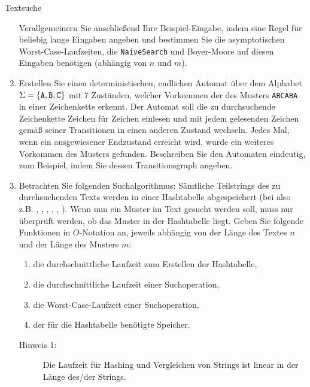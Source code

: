 \documentclass[11pt,a4paper]{article}
\begin{document}
\begin{aufgabe}{3}{Textsuche}
\begin{enumerate}[label=\alph*)]
        Verallgemeinern Sie anschließend Ihre Beispiel-Eingabe, indem eine Regel für beliebig lange  Eingaben angeben und bestimmen Sie die asymptotischen Worst-Case-Laufzeiten, die \texttt{NaiveSearch} und Boyer-Moore auf diesen Eingaben benötigen (abhängig von $n$ und $m$).

        \item Erstellen Sie einen deterministischen, endlichen Automat über dem Alphabet $\Sigma = \{\text{\texttt{A}}, \text{\texttt{B}}, \text{\texttt{C}}\}$ mit 7 Zuständen, welcher Vorkommen der des Musters \texttt{ABCABA} in einer Zeichenkette erkennt.
        Der Automat soll die zu durchsuchende Zeichenkette Zeichen für Zeichen einlesen und mit jedem gelesenden Zeichen gemäß seiner Transitionen in einen anderen Zustand wechseln.
        Jedes Mal, wenn ein ausgewiesener Endzustand erreicht wird, wurde ein weiteres Vorkommen des Musters gefunden.
        Beschreiben Sie den Automaten eindeutig, zum Beispiel, indem Sie dessen Transitionsgraph angeben.
        \item Betrachten Sie folgenden Suchalgorithmus:
        Sämtliche Teilstrings des zu durchsuchenden Texts werden in einer Hashtabelle abgespeichert (bei  also z.B. , , , , , ).
        Wenn nun ein Muster im Text gesucht werden soll, muss nur überprüft werden, ob das Muster in der Hashtabelle liegt.
        Geben Sie folgende Funktionen in $O$-Notation an, jeweils abhängig von der Länge des Textes $n$ und der Länge des Musters $m$:
        \begin{enumerate}[label=\roman*)]
            \item die durchschnittliche Laufzeit zum Erstellen der Hashtabelle,
            \item die durchschnittliche Laufzeit einer Suchoperation,
            \item die Worst-Case-Laufzeit einer Suchoperation,
            \item der für die Hashtabelle benötigte Speicher.
        \end{enumerate}
        \begin{description}
            \item[Hinweis 1:] Die Laufzeit für Hashing und Vergleichen von Strings ist linear in der Länge des/der Strings.

\end{description}
\end{enumerate}
\end{aufgabe}
\end{document}
